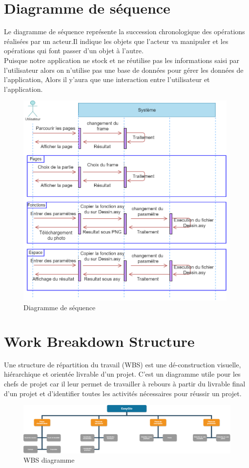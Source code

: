 \documentclass[a4paper]{report}
\begin{document}
\section{Diagramme de séquence}
Le diagramme de séquence représente la succession chronologique des opérations réalisées par un acteur.Il indique les objets que l'acteur va manipuler et les opérations qui font passer d'un objet à l'autre.\\
Puisque notre application ne stock et ne réutilise pas les informations saisi par l'utilisateur alors on n'utilise pas une base de données pour gérer les données de l'application, Alors il y'aura que une interaction entre l'utilisateur et l'application.
\begin{figure}[!h]
    \centering
    \includegraphics[width=11cm]{images/DS.png}
    \caption{Diagramme de séquence}
    \label{fig:Diagramme de séquence}
\end{figure}
\newpage
\section{Work Breakdown Structure}
Une structure de répartition du travail (WBS) est une dé-construction visuelle, hiérarchique et orientée livrable d'un projet. C'est un diagramme utile pour les chefs de projet car il leur permet de travailler à rebours à partir du livrable final d'un projet et d'identifier toutes les activités nécessaires pour réussir un projet.
\begin{figure}[!h]
    \centering
    \includegraphics[width=15cm]{images/WBS.png}
    \caption{WBS diagramme}
    \label{WBS diagrammme}
\end{figure}
\newpage
\end{document}

